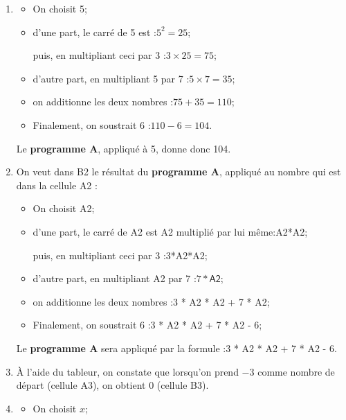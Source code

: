 \begin{enumerate}
	\item \begin{itemize}
		\item On choisit 5;

		\item d'une part, le carré de 5 est :\quad $5^2 = 25$;

		puis, en multipliant ceci par 3 :\quad $3 \times 25 = 75$;

		\item d'autre part, en multipliant 5 par 7 :\quad $5\times 7 = 35$;

		\item on additionne les deux nombres :\quad $75+35=110$;

		\item Finalement, on soustrait 6 :\quad $110-6=104$.
	\end{itemize}
	Le \textbf{programme A}, appliqué à 5, donne donc 104.

	\item On veut dans \textsf{B2} le résultat du \textbf{programme A}, appliqué au nombre qui est dans la cellule \textsf{A2} :
	\begin{itemize}
		\item On choisit \textsf{A2};

		\item d'une part, le carré de \textsf{A2} est \textsf{A2} multiplié par lui même:\quad \textsf{A2*A2};

		puis, en multipliant ceci par 3 :\quad \textsf{3*A2*A2};

		\item d'autre part, en multipliant \textsf{A2} par 7 :\quad $7*\textsf{A2}$;

		\item on additionne les deux nombres :\quad \textsf{3 * A2 * A2 + 7 * A2};

		\item Finalement, on soustrait 6 :\quad \textsf{3 * A2 * A2 + 7 * A2 - 6};
	\end{itemize}
	Le \textbf{programme A} sera appliqué par la formule :\textsf{3 * A2 * A2 + 7 * A2 - 6}.

	\item À l'aide du tableur, on constate que lorsqu'on prend $-3$ comme nombre de départ (cellule \textsf{A3}), on obtient 0 (cellule \textsf{B3}).

	\item \begin{itemize}
		\item On choisit $x$;


\end{itemize}
\end{enumerate}
